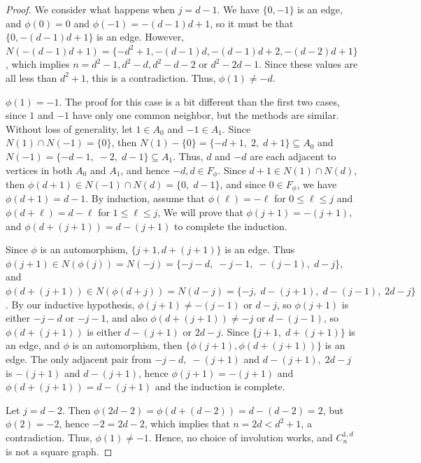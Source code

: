 \documentclass[10pt,a4paper]{amsart}
\begin{document}
\begin{proof}
We consider what happens when $j=d-1$. We have $\{0,-1\}$ is an edge, and $\phi(0)=0$ and $\phi(-1)=-(d-1)d+1$, so it must be that $\{0, -(d-1)d+1\}$ is an edge. 
However, $N(-(d-1)d+1) =\{-d^2+1, -(d-1)d, -(d-1)d+2, -(d-2)d+1\}$, which implies  
$n=d^2-1, d^2-d, d^2-d-2$ or $d^2-2d-1$. Since these values are all less than $d^2+1$, this is a contradiction. 
Thus, $\phi(1)\neq -d$. 

 $\phi(1)=-1$. The proof for this case is a bit different than the first two cases, since $1$ and $-1$ have only one common neighbor, but the methods are similar. Without loss of generality, let $1\in A_0$ and $-1\in A_{1}$. 
Since $N(1)\cap N(-1)=\{0\}$, then $N(1)-\{0\}=\{-d+1,\; 2,\; d+1\}\subseteq A_0$ and $N(-1)=\{-d-1,\;-2,\; d-1\}\subseteq A_1$. 
Thus, $d$ and $-d$ are each adjacent to vertices in both $A_0$ and $A_1$, and hence $-d,d\in F_{\phi}$. Since $d+1\in N(1)\cap N(d)$, then $\phi(d+1)\in N(-1)\cap N(d)=\{0,\; d-1\}$, and since $0\in F_{\phi}$, we have $\phi(d+1)=d-1$. 
By induction, assume that $\phi(\ell)=-\ell$ for $0\leq \ell \leq j$ and $\phi(d+\ell)=d-\ell$ for $1\leq \ell\leq j$, 
We will prove that $\phi(j+1)=-(j+1)$, and $\phi(d+(j+1))=d-(j+1)$ to complete the induction. 

Since $\phi$ is an automorphism, $\{j+1, d+(j+1)\}$ is an edge. Thus $\phi(j+1)\in N(\phi(j))=N(-j)=\{-j-d,\;-j-1,\;-(j-1),\;d-j\}$, and 
$\phi(d+(j+1))\in N(\phi(d+j))=N(d-j)=\{-j,\;d-(j+1),\;d-(j-1),\;2d-j\}$. By our inductive hypothesis, $\phi(j+1)\neq -(j-1)$ or $d-j $, so $\phi(j+1)$ is either $-j-d$ or $-j-1$, and also $\phi(d+(j+1))\neq -j $ or $d-(j-1)$, so
$\phi(d+(j+1))$ is either $d-(j+1)$ or $2d-j$. 
Since $\{j+1,\; d+(j+1)\}$ is an edge, and $\phi$ is an automorphism, then $\{\phi(j+1),\phi(d+(j+1))\}$ is an edge. 
The only adjacent pair from $-j-d,\; -(j+1)$ and $d-(j+1), \;2d-j$ is 
$-(j+1)$ and $d-(j+1)$, hence $\phi(j+1)=-(j+1)$ and $\phi(d+(j+1))=d-(j+1)$ and the induction is complete. 

Let $j=d-2$. Then $\phi(2d-2)=\phi(d+(d-2))=d-(d-2)=2$, but $\phi(2) =-2$, hence $-2=2d-2$, which implies that $n=2d<d^2+1$, a contradiction. Thus, $\phi(1)\neq -1$. Hence, no choice of involution works, and $C_{n}^{1,d}$
is not a square graph. 
\end{proof} 
\end{document}
